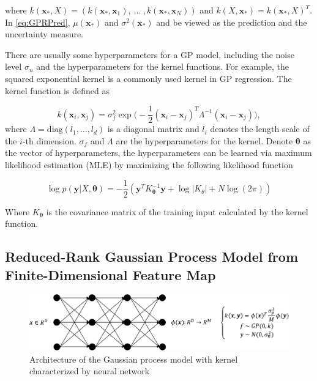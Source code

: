 where $k(\bm{x}_*, X) = (k(\bm{x}_*, \bm{x}_1),~\dots~,k(\bm{x}_*, \bm{x}_N))$ and $k(X, \bm{x}_*) = k(\bm{x}_*, X)^T$. In \eqref{eq:GPRPred}, $\mu(\bm{x}_*)$ and $\sigma^2(\bm{x}_*)$ and be viewed as the prediction and the uncertainty measure.

There are usually some hyperparameters for a GP model, including the noise level $\sigma_n$ and the hyperparameters for the kernel functions. For example, the squared exponential kernel is a commonly used kernel in GP regression. The kernel function is defined as

\begin{equation}
    \label{eq:GaussianCovarianceFunction}
    k(\bm{x}_i, \bm{x}_j) = \sigma_f^2 \exp\Big(-\frac{1}{2}(\bm{x}_i - \bm{x}_j)^T\Lambda^{-1}(\bm{x}_i - \bm{x}_j)\Big),
\end{equation}
where $\Lambda = \mathrm{diag}(l_1, \dots, l_d)$ is a diagonal matrix and $l_i$ denotes the length scale of the $i$-th dimension. $\sigma_f$ and $\Lambda$ are the hyperparameters for the kernel. Denote $\bm{\theta}$ as the vector of hyperparameters, the hyperparameters can be learned via maximum likelihood estimation (MLE) by maximizing the following likelihood function

\begin{equation}
    \label{eq:GPloglikelihood}
    \log p(\bm{y} | X, \bm{\theta}) = -\frac{1}{2}(\bm{y}^T K_{\bm{\theta}}^{-1} \bm{y} + \log |K_{\theta}| + N \log(2 \pi))
\end{equation}

Where $K_{\bm{\theta}}$ is the covariance matrix of the training input calculated by the kernel function.

\subsection{Reduced-Rank Gaussian Process Model from Finite-Dimensional Feature Map}\label{sec:NNGP}

\begin{figure}[!htb]
    \centering
    \includegraphics[width=\columnwidth]{./img/nn1.pdf}
    \caption{Architecture of the Gaussian process model with kernel characterized by neural network}
    \label{fig:NNGP}
\end{figure}

